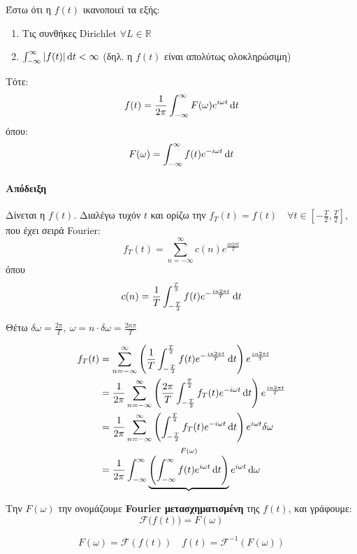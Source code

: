 \documentclass[11pt,a4paper,titlepage,final]{article}
\begin{document}
\begin{theorem*}{}
Έστω ότι η \(f(t)\) ικανοποιεί τα εξής:
\begin{enumerate}
\item Τις συνθήκες \textlatin{Dirichlet} \(\forall L \in  \mathbb R \)
\item \( \int_{-\infty}^\infty |f(t)| \dif t < \infty\) (δηλ. η \(f(t)\) είναι απολύτως ολοκληρώσιμη)
\end{enumerate}

Τότε:
\[
f(t) = \frac{1}{2\pi}
\int_{-\infty}^\infty F(\omega) e^{i\omega t} \dif t
\]
όπου:
\[
F(\omega) = \int_{-\infty}^\infty f(t)e^{-i\omega t} \dif t
\]

\end{theorem*}

\paragraph{Απόδειξη}
Δίνεται η \(f(t)\). Διαλέγω τυχόν \(t\) και ορίζω την \(f_T(t) = f(t)\quad \forall t \in \left[ -\frac{T}{2}, \frac{T}{2} \right]\), που έχει σειρά \textlatin{Fourier}:
\[
f_T(t) = \sum_{n=-\infty}^\infty c(n) e^\frac{in2\pi t}{T}
\]
όπου
\[
c(n) = \frac{1}{T} \int_{-\frac{T}{2}}^\frac{T}{2} f(t) e^{-\frac{in2\pi t}{T}} \dif t
\]

Θέτω \(\delta \omega = \frac{2\pi}{T},\ \omega = n\cdot \delta \omega = \frac{2n\pi}{T}
\)

\begin{align*}
f_T(t) &= \sum_{n=-\infty}^\infty
\left(
\frac{1}{T} \int_{-\frac{T}{2}}^\frac{T}{2} f(t) e^{-\frac{in2\pi t}{T}} \dif t
\right) e^\frac{in2\pi t}{T}
\\ &= \frac{1}{2\pi}
\sum_{n=-\infty}^\infty
\left(
\frac{2\pi}{T}
\int_{-\frac{T}{2}}^\frac{T}{2}
f_T(t)e^{-i\omega t} \dif t
\right) e^\frac{in2\pi t}{T}
\\ &=
\frac{1}{2\pi}
\sum_{n=-\infty}^\infty
\left(
\int_{-\frac{T}{2}}^\frac{T}{2}
f_T(t)e^{-i\omega t} \dif t
\right)
e^{i\omega t} \delta \omega
\\ &=
\frac{1}{2\pi}
\int_{-\infty}^\infty
\underbrace{\left(
\int_{-\infty}^\infty
f(t)e^{i\omega t} \dif t
\right)}^{F(\omega)}
e^{i\omega t}
\dif \omega
\end{align*}

Την \(F(\omega)\) την ονομάζουμε \textbf{\textlatin{Fourier} μετασχηματισμένη} της \(f(t)\), και γράφουμε:
\[
\mathscr{F}\bigg( f(t) \bigg) = F(\omega)
\]

\begin{tcolorbox}
\[
F(\omega) = \mathscr{F} \left( f(t) \right)
\quad
f(t) = \mathscr{F}^{-1} \left( F(\omega) \right)
\]
\end{tcolorbox}
\end{document}
